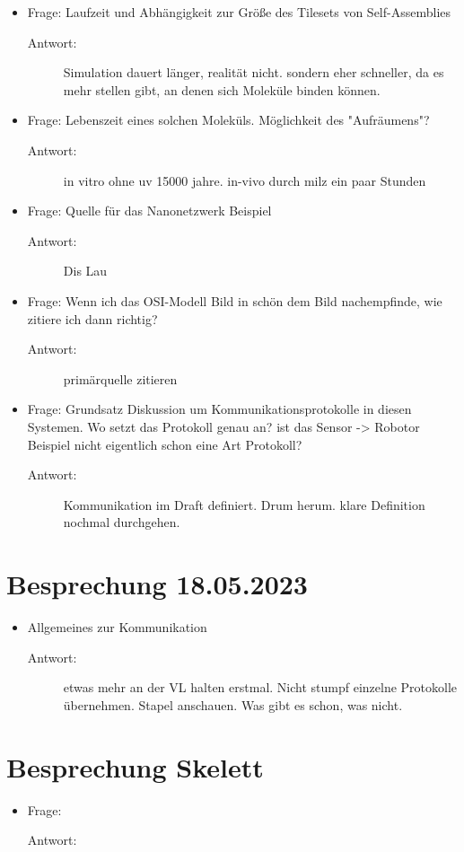 \begin{itemize}
\begin{description}
    \end{description}
    \item Frage: Laufzeit und Abhängigkeit zur Größe des Tilesets von Self-Assemblies
    \begin{description}
      \item[Antwort:]Simulation dauert länger, realität nicht. sondern eher schneller, da es mehr stellen gibt, an denen sich Moleküle binden können.
    \end{description}
    \item Frage: Lebenszeit eines solchen Moleküls. Möglichkeit des "Aufräumens"?
    \begin{description}
      \item[Antwort:] in vitro ohne uv 15000 jahre. in-vivo durch milz ein paar Stunden
    \end{description}
    \item Frage: Quelle für das Nanonetzwerk Beispiel
    \begin{description}
      \item[Antwort:] Dis Lau
    \end{description}
    \item Frage: Wenn ich das OSI-Modell Bild in schön dem Bild nachempfinde, wie zitiere ich dann richtig?
    \begin{description}
      \item[Antwort:] primärquelle zitieren
    \end{description}
    \item Frage: Grundsatz Diskussion um Kommunikationsprotokolle in diesen Systemen. Wo setzt das Protokoll genau an? ist das Sensor -> Robotor Beispiel nicht eigentlich schon eine Art Protokoll?
    \begin{description}
      \item[Antwort:]Kommunikation im Draft definiert. Drum herum. klare Definition nochmal durchgehen.
    \end{description}
  \end{itemize}

\section{Besprechung 18.05.2023}
\begin{itemize}
  \item Allgemeines zur Kommunikation
  \begin{description}
    \item[Antwort:] etwas mehr an der VL halten erstmal. Nicht stumpf einzelne Protokolle übernehmen. Stapel anschauen. Was gibt es schon, was nicht.
  \end{description}
\end{itemize}

\section{Besprechung Skelett}
  \begin{itemize}
    \item Frage:
    \begin{description}
      \item[Antwort:]
    \end{description}
  \end{itemize}
